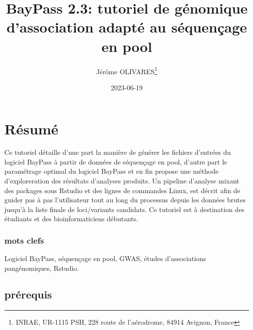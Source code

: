 \documentclass[
  openany]{book}
\title{BayPass 2.3: tutoriel de génomique d'association adapté au séquençage en pool}
\author{Jérôme OLIVARES\footnote{INRAE, UR-1115 PSH, 228 route de l'aérodrome, 84914 Avignon, France}}
\date{2023-06-19}
\begin{document}
\maketitle

{
\hypersetup{linkcolor=}
\setcounter{tocdepth}{1}
\tableofcontents
}
\hypertarget{ruxe9sumuxe9}{%
\chapter*{Résumé}\label{ruxe9sumuxe9}}

Ce tutoriel détaille d'une part la manière de générer les fichiers d'entrées du logiciel BayPass à partir de données de séquençage en pool, d'autre part le paramétrage optimal du logiciel BayPass et en fin propose une méthode d'exploreration des résultats d'analyses produits. Un pipeline d'analyse mixant des packages sous Rstudio et des lignes de commandes Linux, est décrit afin de guider pas à pas l'utilisateur tout au long du processus depuis les données brutes jusqu'à la liste finale de loci/variants candidats.
Ce tutoriel est à destination des étudiants et des bioinformaticiens débutants.

\hypertarget{mots-clefs}{%
\subsection*{mots clefs}\label{mots-clefs}}

Logiciel BayPass, séquençage en pool, GWAS, études d'associations pangénomiques, Rstudio.

\hypertarget{pruxe9requis}{%
\section*{prérequis}\label{pruxe9requis}}
\end{document}
